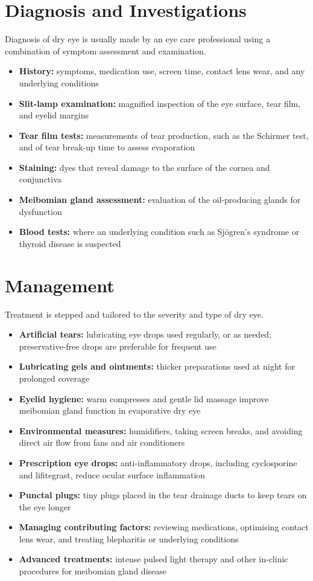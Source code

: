 \section*{Diagnosis and Investigations}
Diagnosis of dry eye is usually made by an eye care professional using a combination of symptom assessment and examination.
\begin{itemize}
    \item \textbf{History:} symptoms, medication use, screen time, contact lens wear, and any underlying conditions
    \item \textbf{Slit-lamp examination:} magnified inspection of the eye surface, tear film, and eyelid margins
    \item \textbf{Tear film tests:} measurements of tear production, such as the Schirmer test, and of tear break-up time to assess evaporation
    \item \textbf{Staining:} dyes that reveal damage to the surface of the cornea and conjunctiva
    \item \textbf{Meibomian gland assessment:} evaluation of the oil-producing glands for dysfunction
    \item \textbf{Blood tests:} where an underlying condition such as Sjögren's syndrome or thyroid disease is suspected
\end{itemize}

\section*{Management}
Treatment is stepped and tailored to the severity and type of dry eye.
\begin{itemize}
    \item \textbf{Artificial tears:} lubricating eye drops used regularly, or as needed; preservative-free drops are preferable for frequent use
    \item \textbf{Lubricating gels and ointments:} thicker preparations used at night for prolonged coverage
    \item \textbf{Eyelid hygiene:} warm compresses and gentle lid massage improve meibomian gland function in evaporative dry eye
    \item \textbf{Environmental measures:} humidifiers, taking screen breaks, and avoiding direct air flow from fans and air conditioners
    \item \textbf{Prescription eye drops:} anti-inflammatory drops, including cyclosporine and lifitegrast, reduce ocular surface inflammation
    \item \textbf{Punctal plugs:} tiny plugs placed in the tear drainage ducts to keep tears on the eye longer
    \item \textbf{Managing contributing factors:} reviewing medications, optimising contact lens wear, and treating blepharitis or underlying conditions
    \item \textbf{Advanced treatments:} intense pulsed light therapy and other in-clinic procedures for meibomian gland disease
\end{itemize}

